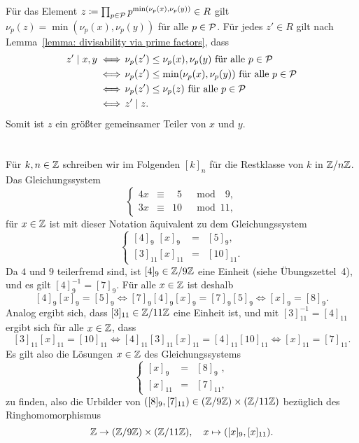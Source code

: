 \documentclass[a4paper,10pt,numbers=noenddot]{scrartcl}
\begin{document}
Für das Element $z \coloneqq \prod_{p \in \mathcal{P}} p^{\min(\nu_p(x), \nu_p(y))} \in R$ gilt $\nu_p(z) = \min( \nu_p(x), \nu_p(y) )$ für alle $p \in \mathcal{P}$.
Für jedes $z' \in R$ gilt nach Lemma~\ref{lemma: divisability via prime factors}, dass
\begin{align*}
          z' \mid x,y
  \iff&\, \text{$\nu_p(z') \leq \nu_p(x), \nu_p(y)$ für alle $p \in \mathcal{P}$}
  \\
  \iff&\, \text{$\nu_p(z') \leq \min(\nu_p(x), \nu_p(y))$ für alle $p \in \mathcal{P}$}
  \\
  \iff&\, \text{$\nu_p(z') \leq \nu_p(z)$ für alle $p \in \mathcal{P}$}
  \\
  \iff&\, z' \mid z.
\end{align*}
Somit ist $z$ ein größter gemeinsamer Teiler von $x$ und $y$.




\section{}

Für $k, n \in \mathbb{Z}$ schreiben wir im Folgenden $[k]_n$ für die Restklasse von $k$ in $\mathbb{Z}/n\mathbb{Z}$.
Das Gleichungssystem
\[
  \left\{
    \begin{matrix}
      4x  & \equiv  & \phantom{1}5  & \mod \phantom{1}9,
    \\
      3x  & \equiv  &           10  & \mod           11,
    \end{matrix}
  \right.
\]
für $x \in \mathbb{Z}$ ist mit dieser Notation äquivalent zu dem Gleichungssystem
\[
  \left\{
    \begin{matrix}
      [4]_{9\phantom{1}}  [x]_{9\phantom{1}}  & = & [5]_9,
    \\
      [3]_{11}            [x]_{11}            & = & [10]_{11}.
    \end{matrix}
  \right.
\]
Da $4$ und $9$ teilerfremd sind, ist $[4]_9 \in \mathbb{Z}/9\mathbb{Z}$ eine Einheit (siehe Übungszettel~4), und es gilt $[4]_9^{-1} = [7]_9$.
Für alle $x \in \mathbb{Z}$ ist deshalb
\[
              [4]_9 [x]_9 = [5]_9
  \iff  [7]_9 [4]_9 [x]_9 = [7]_9 [5]_9
  \iff              [x]_9 = [8]_9.
\]
Analog ergibt sich, dass $[3]_{11} \in \mathbb{Z}/11\mathbb{Z}$ eine Einheit ist, und mit $[3]_{11}^{-1} = [4]_{11}$ ergibt sich für alle $x \in \mathbb{Z}$, dass
\[
                 [3]_{11} [x]_{11}  = [10]_{11}
  \iff  [4]_{11} [3]_{11} [x]_{11}  = [4]_{11} [10]_{11}
  \iff                    [x]_{11}  = [7]_{11}.
\]
Es gilt also die Lösungen $x \in \mathbb{Z}$ des Gleichungssystems
\[
  \left\{
    \begin{matrix}
      [x]_{9\phantom{1}}  & = & [8]_{9\phantom{1}},
    \\
      [x]_{11}            & = & [7]_{11},
    \end{matrix}
  \right.
\]
zu finden, also die Urbilder von $([8]_9, [7]_{11}) \in (\mathbb{Z}/9\mathbb{Z}) \times (\mathbb{Z}/11\mathbb{Z})$ bezüglich des Ringhomomorphismus
\[
  \mathbb{Z} \to (\mathbb{Z}/9\mathbb{Z}) \times (\mathbb{Z}/11\mathbb{Z}),
  \quad
  x \mapsto ([x]_9, [x]_{11}).
\]
\end{document}
